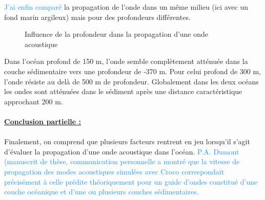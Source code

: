 \documentclass{rapportECC}
\newcommand{\FAadd}[1]{\textcolor{DodgerBlue}{{#1}}}                     %
\begin{document}
\FAadd{J'ai enfin comparé} la propagation de l'onde dans un même milieu (ici avec un fond marin argileux) mais pour des profondeurs différentes. 

\begin{figure}[H]
    \centering
    \label{fig:image1}\hfill
    \caption{Influence de la profondeur dans la propagation d'une onde acoustique}
    \label{fig:images_cote_a_cote}
\end{figure}
Dans l'océan profond de 150 m, l'onde semble complètement atténuée dans la couche sédimentaire vers une profondeur de -370 m. Pour celui profond de 300 m, l'onde résiste au delà de 500 m de profondeur. Globalement dans les deux océans les ondes sont atténuées dans le sédiment après une distance caractéristique approchant 200 m. \\
\\
\underline{\textbf{Conclusion partielle :}} \\
\\
Finalement, on comprend que plusieurs facteurs rentrent en jeu lorsqu'il s'agit d'évaluer la propagation d'une onde acoustique dans l'océan.
\FAadd{P.A. Dumont (manuscrit de thèse, communication personnelle a montré que la vitesse de propagation des modes acoustiques simulées avec Croco correspondait précisément à celle prédite théoriquement pour un guide d'ondes constitué d'une couche océanique et d'une ou plusieurs couches sédimentaires.}
\end{document}
